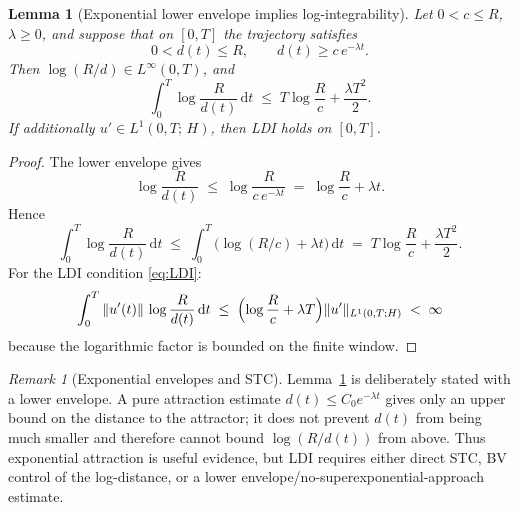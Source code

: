 \documentclass[12pt,a4paper]{article}
\theoremstyle{definition}
\theoremstyle{plain}
\newtheorem{lemma}[definition]{Lemma}
\theoremstyle{remark}
\newtheorem{remark}[definition]{Remark}
\begin{document}
\begin{lemma}[Exponential lower envelope implies log-integrability]
\label{lem:stc-tracking}
Let $0<c\le R$, $\lambda\ge 0$, and suppose that on $[0,T]$
the trajectory satisfies
\[
  0<d(t)\le R,
  \qquad
  d(t)\ge c\,e^{-\lambda t}.
\]
Then $\log(R/d) \in L^\infty(0,T)$, and
\[
  \int_0^T \log\frac{R}{d(t)}\,\mathrm{d}t
  \;\le\;
  T\log\frac{R}{c} + \frac{\lambda T^2}{2}.
\]
If additionally $u'\in L^1(0,T;\,H)$, then LDI holds on $[0,T]$.
\end{lemma}

\begin{proof}
The lower envelope gives
\[
  \log\frac{R}{d(t)}
  \;\le\;
  \log\frac{R}{c\,e^{-\lambda t}}
  \;=\;
  \log\frac{R}{c}+\lambda t.
\]
Hence
\[
  \int_0^T \log\frac{R}{d(t)}\,\mathrm{d}t
  \;\le\;
  \int_0^T \bigl(\log(R/c)+\lambda t\bigr)\,\mathrm{d}t
  \;=\;
  T\log\frac{R}{c}+\frac{\lambda T^2}{2}.
\]
For the LDI condition \eqref{eq:LDI}:
\[
  \int_0^T \|u'(t)\|\,\log\frac{R}{d(t)}\,\mathrm{d}t
  \;\le\;
  \Bigl(\log\frac{R}{c}+\lambda T\Bigr)
  \|u'\|_{L^1(0,T;H)}
  \;<\; \infty
\]
because the logarithmic factor is bounded on the finite window.
\end{proof}

\begin{remark}[Exponential envelopes and STC]
\label{rem:exp-tracking-strongest}
Lemma~\ref{lem:stc-tracking} is deliberately stated with a
lower envelope.  A pure attraction estimate
$d(t)\le C_0e^{-\lambda t}$ gives only an upper bound on the
distance to the attractor; it does not prevent $d(t)$ from being
much smaller and therefore cannot bound $\log(R/d(t))$ from above.
Thus exponential attraction is useful evidence, but LDI requires
either direct STC, BV control of the log-distance, or a lower
envelope/no-superexponential-approach estimate.
\end{remark}
\end{document}
